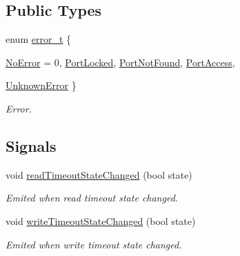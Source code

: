 \subsection*{Public Types}
\begin{DoxyCompactItemize}
\item 
enum \hyperlink{classmdt_abstract_port_ad4121bb930c95887e77f8bafa065a85e}{error\_\-t} \{ \par
\hyperlink{classmdt_abstract_port_ad4121bb930c95887e77f8bafa065a85eab898bd273effe5cb4ed1a399a2d4baad}{NoError} =  0, 
\hyperlink{classmdt_abstract_port_ad4121bb930c95887e77f8bafa065a85eaedd63daf0db75794bb8e8e467da9575c}{PortLocked}, 
\hyperlink{classmdt_abstract_port_ad4121bb930c95887e77f8bafa065a85ea54a896ba3ff98896390e87bfe1f29eb0}{PortNotFound}, 
\hyperlink{classmdt_abstract_port_ad4121bb930c95887e77f8bafa065a85eaee5a84e59e9dc5fcf27cac57068bb1f4}{PortAccess}, 
\par
\hyperlink{classmdt_abstract_port_ad4121bb930c95887e77f8bafa065a85eacb8cc31d0b00dda9e25ed1cc1fa17871}{UnknownError}
 \}
\begin{DoxyCompactList}\small\item\em Error. \end{DoxyCompactList}\end{DoxyCompactItemize}
\subsection*{Signals}
\begin{DoxyCompactItemize}
\item 
\hypertarget{classmdt_abstract_port_a62c5e1f2beb6eddf740c8710ecb84ad1}{
void \hyperlink{classmdt_abstract_port_a62c5e1f2beb6eddf740c8710ecb84ad1}{readTimeoutStateChanged} (bool state)}
\label{classmdt_abstract_port_a62c5e1f2beb6eddf740c8710ecb84ad1}

\begin{DoxyCompactList}\small\item\em Emited when read timeout state changed. \end{DoxyCompactList}\item 
\hypertarget{classmdt_abstract_port_abd4a3e5738ac13167ddaafe95926ce4d}{
void \hyperlink{classmdt_abstract_port_abd4a3e5738ac13167ddaafe95926ce4d}{writeTimeoutStateChanged} (bool state)}
\label{classmdt_abstract_port_abd4a3e5738ac13167ddaafe95926ce4d}

\begin{DoxyCompactList}\small\item\em Emited when write timeout state changed. \end{DoxyCompactList}\end{DoxyCompactItemize}
